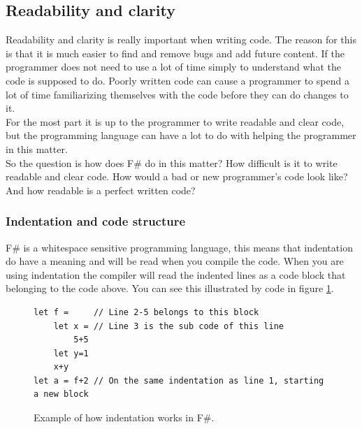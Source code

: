 \documentclass[12pt, a4paper]{article}
\begin{document}



\newpage
\subsection{Readability and clarity}
Readability and clarity is really important when writing code. The reason for this is that it is much easier to find and remove bugs and add future content. If the programmer does not need to use a lot of time simply to understand what the code is supposed to do. Poorly written code can cause a programmer to spend a lot of time familiarizing themselves with the code before they can do changes to it.\\

For the most part it is up to the programmer to write readable and clear code, but the programming language can have a lot to do with helping the programmer in this matter.\\


So the question is how does F\# do in this matter? How difficult is it to write readable and clear code. How would a bad or new programmer's code look like? And how readable is a perfect written code?

\newpage
\subsubsection{Indentation and code structure}
\label{indentationAndCodeStructure}
F\# is a whitespace sensitive programming language, this means that indentation do have a meaning and will be read when you compile the code. When you are using indentation the compiler will read the indented lines as a code block that belonging to the code above. You can see this illustrated by code in figure \ref{fig:indentationExample}.

\begin{figure}[!h]
	\begin{lstlisting}
let f = 	// Line 2-5 belongs to this block
	let x = // Line 3 is the sub code of this line
		5+5	
	let y=1
  	x+y
let a = f+2	// On the same indentation as line 1, starting a new block
	\end{lstlisting}
	\caption{Example of how indentation works in F\#.}
	\label{fig:indentationExample}
\end{figure}
\end{document}
